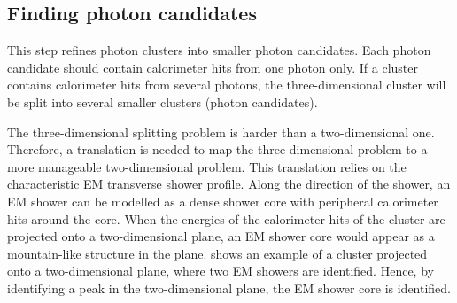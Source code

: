 
\subsection{Finding photon candidates}
\label{sec:photonCandiate}

This step refines photon clusters into smaller photon candidates. Each photon candidate should contain calorimeter hits from one photon only. If a cluster contains calorimeter hits from several photons, the three-dimensional cluster will be split into several smaller clusters (photon candidates).

The three-dimensional splitting problem is harder than a two-dimensional one. Therefore, a translation is needed to map the three-dimensional problem to a more manageable two-dimensional problem. This translation relies on the characteristic EM transverse shower profile. Along the direction of the shower, an EM shower can be modelled as a dense shower core with peripheral calorimeter hits around the core. When the energies of the calorimeter hits of the cluster are projected onto a two-dimensional plane, an EM shower core would appear as a mountain-like structure in the plane.  shows an example of a cluster projected onto a two-dimensional plane, where two EM showers are identified. Hence, by identifying a peak in the two-dimensional plane, the EM shower core is identified.





